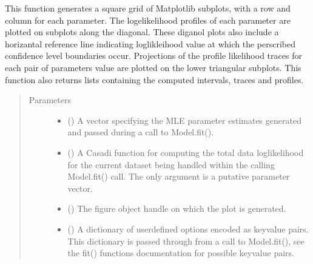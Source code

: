 \documentclass[letterpaper,10pt,english,openany,oneside]{sphinxmanual}
\begin{document}
\begin{fulllineitems}
\begin{fulllineitems}
This function generates a square grid of Matplotlib sub\sphinxhyphen{}plots, with a row and column for each
parameter. The logelikelihood profiles of each parameter are plotted on sub\sphinxhyphen{}plots along the
diagonal. These diganol plots also include a horizantal reference line indicating
loglikleihood value at which the perscribed confidence level boundaries occur. Projections
of the profile likelihood traces for each pair of parameters value are plotted on the lower
triangular sub\sphinxhyphen{}plots. This function also returns lists containing the computed intervals,
traces and profiles.
\begin{quote}\begin{description}
\item[{Parameters}] \leavevmode\begin{itemize}
\item {} 
 (\sphinxstyleliteralemphasis{\sphinxupquote{, }}) \textendash{} A vector specifying the MLE parameter estimates generated and
passed during a call to Model.fit().

\item {} 
 () \textendash{} A Casadi function for computing the total data log\sphinxhyphen{}likelihood
for the current dataset being handled within the calling Model.fit() call. The only
argument is a putative parameter vector.

\item {} 
 () \textendash{} The figure object handle on which the plot is generated.

\item {} 
 () \textendash{} A dictionary of user\sphinxhyphen{}defined options encoded as key\sphinxhyphen{}value
pairs. This dictionary is passed through from a call to Model.fit(), see
the fit() functions documentation for possible key\sphinxhyphen{}value pairs.

\end{itemize}


\end{description}
\end{quote}
\end{fulllineitems}
\end{fulllineitems}
\end{document}
